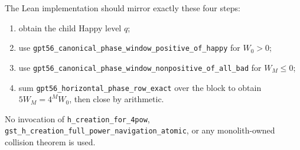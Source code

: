 The Lean implementation should mirror exactly these four steps:
\begin{enumerate}
\item obtain the child Happy level $q$;
\item use \texttt{gpt56\_canonical\_phase\_window\_positive\_of\_happy} for $W_0>0$;
\item use \texttt{gpt56\_canonical\_phase\_window\_nonpositive\_of\_all\_bad} for $W_M\le0$;
\item sum \texttt{gpt56\_horizontal\_phase\_row\_exact} over the block to obtain $5W_M=4^M W_0$, then close by arithmetic.
\end{enumerate}

No invocation of \texttt{h\_creation\_for\_4pow}, \texttt{gst\_h\_creation\_full\_power\_navigation\_atomic}, or any monolith-owned collision theorem is used.
